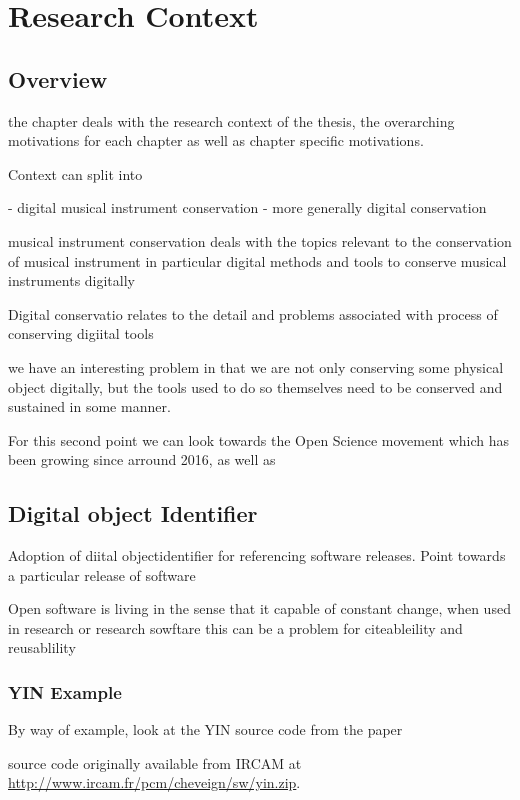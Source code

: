 \chapter{Research Context}

\section{Overview}

the chapter deals with the research context of the thesis, the overarching motivations for each chapter as well as chapter specific motivations.

Context can split into 

- digital musical instrument conservation
- more generally digital conservation

musical instrument conservation deals with the topics relevant to the conservation of musical instrument in particular digital methods and tools to conserve musical instruments digitally

Digital conservatio relates to the detail and problems associated with process of conserving digiital tools

we have an interesting problem in that we are not only conserving some physical object digitally, but the tools used to do so themselves need to be conserved and  sustained in some manner.

For this second point we can look towards the Open Science movement which has been growing since arround 2016, as well as 

\section{Digital object Identifier}

Adoption of diital objectidentifier for referencing software releases. Point towards a particular release of software

Open software is living in the sense that it capable of constant change, when used in research or research sowftare this can be a problem for citeableility and reusablility

\subsection{YIN Example}

By way of example, look at the YIN source code from the paper \cite{cheveigne_yin-a-fundamental_2002} 

source code originally available from IRCAM at \url{http://www.ircam.fr/pcm/cheveign/sw/yin.zip}. 

